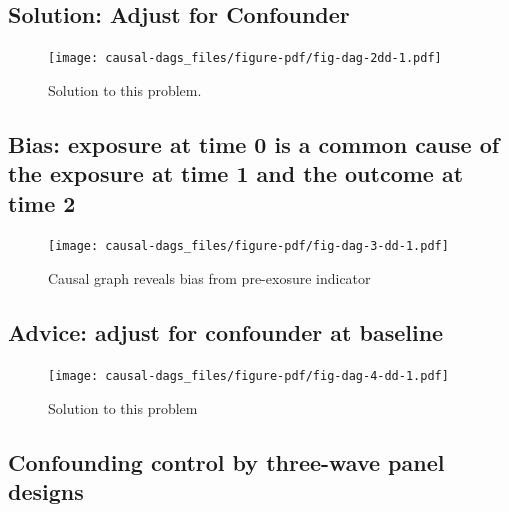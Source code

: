 \documentclass[
  singlecolumn]{report}
\begin{document}
\hypertarget{solution-adjust-for-confounder}{%
\subsection{Solution: Adjust for
Confounder}\label{solution-adjust-for-confounder}}

\begin{figure}

{\centering \texttt{[image: causal-dags\_files/figure-pdf/fig-dag-2dd-1.pdf]}

}

\caption{\label{fig-dag-2dd}Solution to this problem.}

\end{figure}

\hypertarget{bias-exposure-at-time-0-is-a-common-cause-of-the-exposure-at-time-1-and-the-outcome-at-time-2}{%
\subsection{Bias: exposure at time 0 is a common cause of the exposure
at time 1 and the outcome at time
2}\label{bias-exposure-at-time-0-is-a-common-cause-of-the-exposure-at-time-1-and-the-outcome-at-time-2}}

\begin{figure}

{\centering \texttt{[image: causal-dags\_files/figure-pdf/fig-dag-3-dd-1.pdf]}

}

\caption{\label{fig-dag-3-dd}Causal graph reveals bias from pre-exosure
indicator}

\end{figure}

\hypertarget{advice-adjust-for-confounder-at-baseline}{%
\subsection{Advice: adjust for confounder at
baseline}\label{advice-adjust-for-confounder-at-baseline}}

\begin{figure}

{\centering \texttt{[image: causal-dags\_files/figure-pdf/fig-dag-4-dd-1.pdf]}

}

\caption{\label{fig-dag-4-dd}Solution to this problem}

\end{figure}

\hypertarget{confounding-control-by-three-wave-panel-designs}{%
\subsection{Confounding control by three-wave panel
designs}\label{confounding-control-by-three-wave-panel-designs}}
\end{document}
